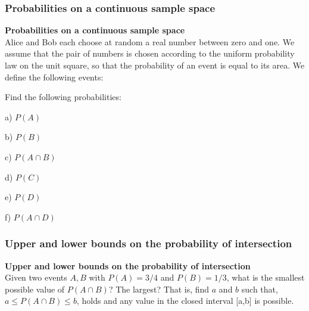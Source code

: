 \documentclass[pdftex, brazil, 12pt, twoside]{article}
\begin{document}
\subsubsection{Probabilities on a continuous sample space}
\label{un1-ps1-continuous-sample-space}

\begin{exercise}
  \textbf{Probabilities on a continuous sample space}\\
  Alice and Bob each choose at random a real number between zero and one. We
  assume that the pair of numbers is chosen according to the uniform probability
  law on the unit square, so that the probability of an event is equal to its area.
  We define the following events:

  \begin{figure}[H]
    \begin{center}
    \end{center}
  \end{figure}

  Find the following probabilities:

  a) $P(A)$

  b) $P(B)$

  c) $P(A \cap B)$

  d) $P(C)$

  e) $P(D)$

  f) $P(A \cap D)$
\end{exercise}

\subsubsection{Upper and lower bounds on the probability of intersection}
\label{un1-ps1-prob-intersection}

\begin{exercise}
  \textbf{Upper and lower bounds on the probability of intersection}\\
  Given two events $A, B$ with $P(A)=3/4$ and $P(B)=1/3$, what is the smallest
  possible value of $P(A \cap B)$? The largest? That is, find $a$ and $b$ such that,
  $a \le P(A \cap B) \le b$, holds and any value in the closed interval [a,b]
  is possible.
\end{exercise}
\end{document}
